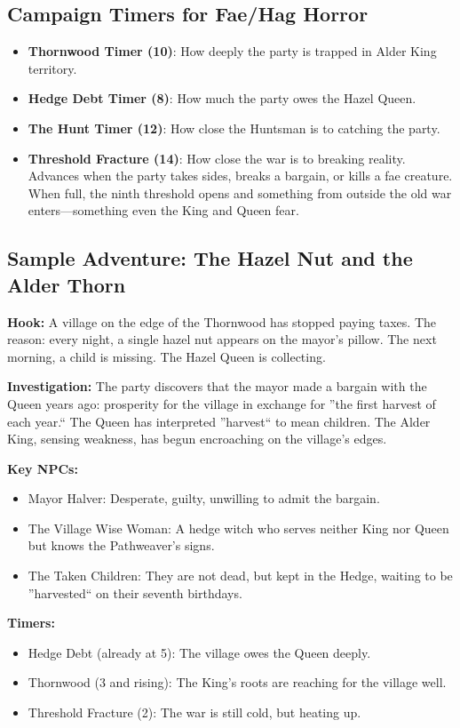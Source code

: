 \documentclass[11pt]{article}
\begin{document}
\subsection{Campaign Timers for Fae/Hag Horror}

\begin{itemize}
\item \textbf{Thornwood Timer (10)}: How deeply the party is trapped in Alder King territory.
\item \textbf{Hedge Debt Timer (8)}: How much the party owes the Hazel Queen.
\item \textbf{The Hunt Timer (12)}: How close the Huntsman is to catching the party.
\item \textbf{Threshold Fracture (14)}: How close the war is to breaking reality. Advances when the party takes sides, breaks a bargain, or kills a fae creature. When full, the ninth threshold opens and something from outside the old war enters---something even the King and Queen fear.
\end{itemize}

\subsection{Sample Adventure: The Hazel Nut and the Alder Thorn}

\textbf{Hook:} A village on the edge of the Thornwood has stopped paying taxes. The reason: every night, a single hazel nut appears on the mayor's pillow. The next morning, a child is missing. The Hazel Queen is collecting.

\textbf{Investigation:} The party discovers that the mayor made a bargain with the Queen years ago: prosperity for the village in exchange for ''the first harvest of each year.`` The Queen has interpreted ''harvest`` to mean children. The Alder King, sensing weakness, has begun encroaching on the village's edges.

\textbf{Key NPCs:}
\begin{itemize}
\item Mayor Halver: Desperate, guilty, unwilling to admit the bargain.
\item The Village Wise Woman: A hedge witch who serves neither King nor Queen but knows the Pathweaver's signs.
\item The Taken Children: They are not dead, but kept in the Hedge, waiting to be ''harvested`` on their seventh birthdays.
\end{itemize}

\textbf{Timers:}
\begin{itemize}
\item Hedge Debt (already at 5): The village owes the Queen deeply.
\item Thornwood (3 and rising): The King's roots are reaching for the village well.
\item Threshold Fracture (2): The war is still cold, but heating up.
\end{itemize}
\end{document}
